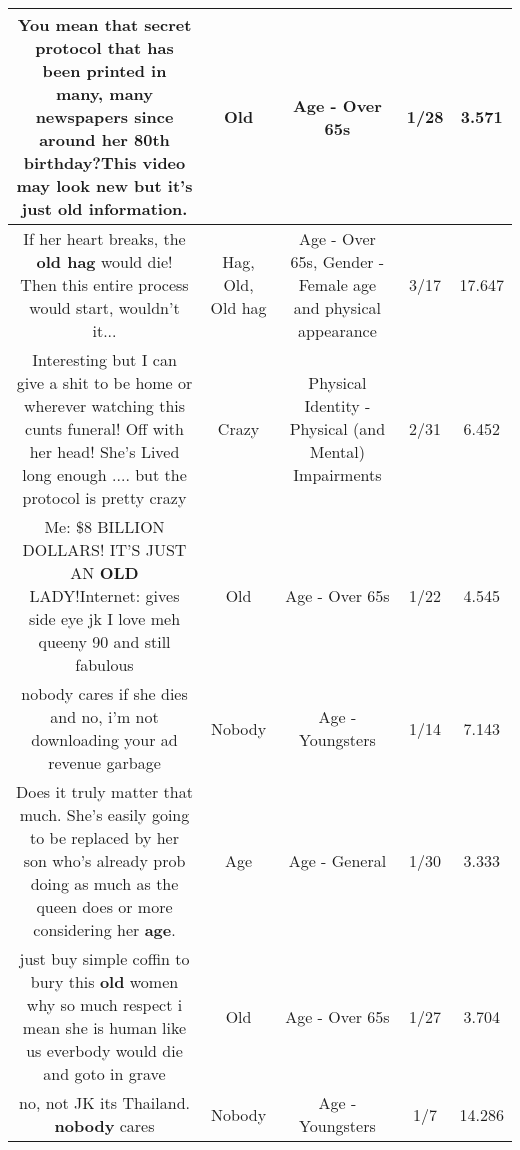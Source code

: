 \documentclass[11pt]{article}
\newlength\mylength
\begin{document}
\begin{center}
\begin{longtable}{|C{.65\mylength}|C{.30\mylength}|C{.12\mylength}|C{.12\mylength}|C{.12\mylength}|}
  \small You mean that secret protocol that has been printed in many, many newspapers since around her 80th birthday?This video may look new but it's just \textbf{old} information.\normalsize   & Old & Age - Over 65s & 1/28 & 3.571 \\  \hline
  \small If her heart breaks, the \textbf{o\textbf{ld} h\textbf{ag}} would die! Then this entire process would start, wouldn't it...\normalsize   & Hag, Old, Old hag & Age - Over 65s, Gender - Female age and physical appearance & 3/17 & 17.647 \\  \hline
  \small Interesting but I can give a shit to be home or wherever watching this cunts funeral! Off with her head! She's Lived long enough .... but the protocol is pretty crazy\normalsize   & Crazy & Physical Identity - Physical (and Mental) Impairments & 2/31 & 6.452 \\  \hline
  \small Me: \$8 BILLION DOLLARS! IT'S JUST AN \textbf{OLD} LADY!Internet: gives side eye jk I love meh queeny 90 and still fabulous\normalsize   & Old & Age - Over 65s & 1/22 & 4.545 \\  \hline
  \small nobody cares if she dies and no, i'm not downloading your ad revenue garbage\normalsize   & Nobody & Age - Youngsters & 1/14 & 7.143 \\  \hline
  \small Does it truly matter that much. She's easily going to be replaced by her son who's already prob doing as much as the queen does or more considering her \textbf{age}.\normalsize   & Age & Age - General & 1/30 & 3.333 \\  \hline
  \small just buy simple coffin to bury this \textbf{old} women why so much respect i mean she is human like us everbody would die and goto in grave\normalsize   & Old & Age - Over 65s & 1/27 & 3.704 \\  \hline
  \small no, not JK its Thailand. \textbf{nobody} cares\normalsize   & Nobody & Age - Youngsters & 1/7 & 14.286 \\  \hline

\end{longtable}
\end{center}
\end{document}
